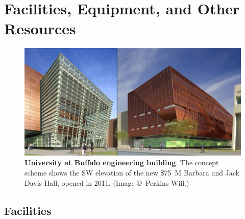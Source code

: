 \chapter{Facilities, Equipment, and Other Resources}
\thispagestyle{empty}


\begin{figure}[h!]
\centering
\includegraphics[width=\textwidth]{./figures/UBNewBuilding}

\caption{\textbf{University at Buffalo engineering building}. The concept
scheme shows the SW elevation of the new \$75~M Barbara and Jack Davis Hall,
opened in 2011. (Image \copyright~Perkins Will.)}

\label{figure-newbuilding}
\end{figure}

\section{Facilities}

%

%

